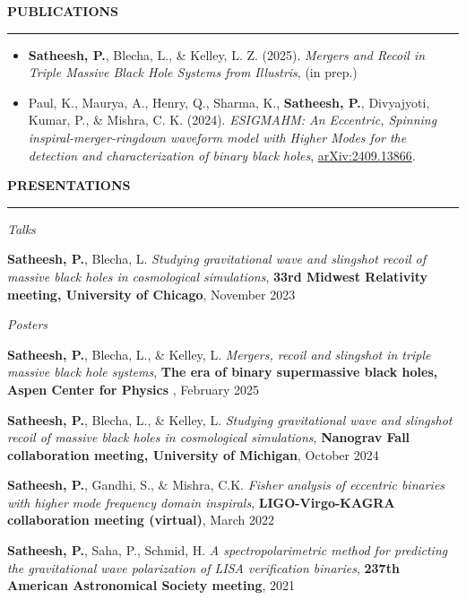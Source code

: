 \documentclass{resume} %
\renewenvironment{rSection}[1]{
\sectionskip
\textbf{\textcolor{C2}{\MakeUppercase{#1}}}
\sectionlineskip
\hrule
\begin{list}{}{
\setlength{\leftmargin}{1.5em}
}
\item[]
}{
\end{list}
}
\newcommand{\conference}[1]{\textcolor{C2}{\textbf{#1}}}
\begin{document}
\begin{rSection}{Publications}
\begin{itemize}
    \item \textbf{Satheesh, P.}, Blecha, L., \& Kelley, L. Z. (2025). \emph{Mergers and Recoil in Triple Massive Black Hole Systems from Illustris}, (in prep.)
    \item Paul, K., Maurya, A., Henry, Q., Sharma, K., \textbf{Satheesh, P.}, Divyajyoti, Kumar, P., \& Mishra, C. K. (2024). \emph{ESIGMAHM: An Eccentric, Spinning inspiral-merger-ringdown waveform model with Higher Modes for the detection and characterization of binary black holes}, \href{https://arxiv.org/abs/2409.13866}{arXiv:2409.13866}.
\end{itemize}

\end{rSection}

\begin{rSection}{Presentations}
    \begin{rSubsection}{\textit{Talks}}{}{}{}
        \item \textbf{Satheesh, P.}, Blecha, L. \emph{Studying gravitational wave and slingshot recoil of massive black holes in cosmological simulations}, \conference{33rd Midwest Relativity meeting, University of Chicago}, November 2023 
    \end{rSubsection}
    \begin{rSubsection}{\textit{Posters}}{}{}{}
        \item \textbf{Satheesh, P.}, Blecha, L., \& Kelley, L. \emph{Mergers, recoil and slingshot in triple massive black hole systems}, \conference{The era of binary supermassive black holes, Aspen Center for Physics} , February 2025
        \item \textbf{Satheesh, P.}, Blecha, L., \& Kelley, L. \emph{Studying gravitational wave and slingshot recoil of massive black holes in cosmological simulations}, \conference{Nanograv Fall collaboration meeting, University of Michigan}, October 2024
        \item \textbf{Satheesh, P.}, Gandhi, S., \& Mishra, C.K. \emph{Fisher analysis of eccentric binaries with higher mode frequency domain inspirals}, \conference{LIGO-Virgo-KAGRA collaboration meeting (virtual)},  March 2022 
        \item \textbf{Satheesh, P.}, Saha, P., Schmid, H. \emph{A spectropolarimetric method for predicting the gravitational wave polarization of LISA verification binaries}, \conference{237th American Astronomical Society meeting}, 2021
    \end{rSubsection}
\end{rSection}
\end{document}
